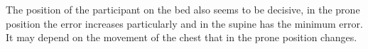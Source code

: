 The position of the participant on the bed also seems to be decisive, in the prone position the error increases particularly and in the supine has the minimum error. It may depend on the movement of the chest that in the prone position changes.\\

